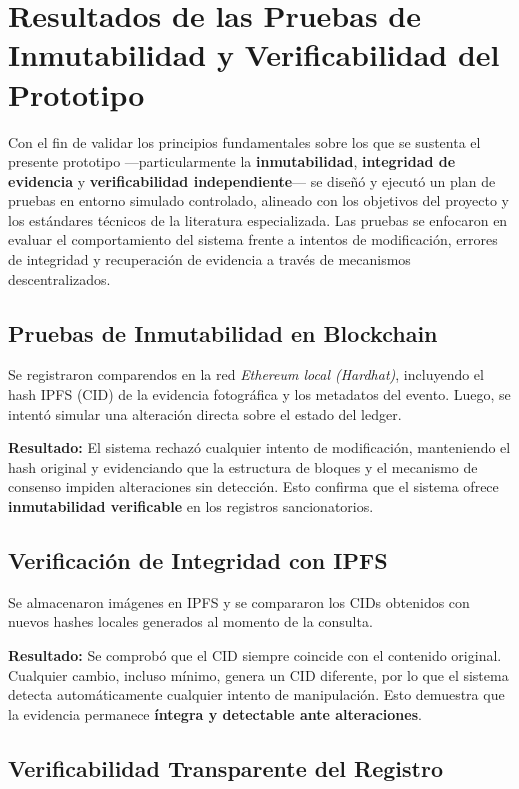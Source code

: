 \section{Resultados de las Pruebas de Inmutabilidad y Verificabilidad del Prototipo}

Con el fin de validar los principios fundamentales sobre los que se sustenta el presente prototipo —particularmente la \textbf{inmutabilidad}, \textbf{integridad de evidencia} y \textbf{verificabilidad independiente}— se diseñó y ejecutó un plan de pruebas en entorno simulado controlado, alineado con los objetivos del proyecto y los estándares técnicos de la literatura especializada. Las pruebas se enfocaron en evaluar el comportamiento del sistema frente a intentos de modificación, errores de integridad y recuperación de evidencia a través de mecanismos descentralizados.

\subsection{Pruebas de Inmutabilidad en Blockchain}

Se registraron comparendos en la red \textit{Ethereum local (Hardhat)}, incluyendo el hash IPFS (CID) de la evidencia fotográfica y los metadatos del evento. Luego, se intentó simular una alteración directa sobre el estado del ledger.

\textbf{Resultado:} El sistema rechazó cualquier intento de modificación, manteniendo el hash original y evidenciando que la estructura de bloques y el mecanismo de consenso impiden alteraciones sin detección. Esto confirma que el sistema ofrece \textbf{inmutabilidad verificable} en los registros sancionatorios.

\subsection{Verificación de Integridad con IPFS}

Se almacenaron imágenes en IPFS y se compararon los CIDs obtenidos con nuevos hashes locales generados al momento de la consulta.

\textbf{Resultado:} Se comprobó que el CID siempre coincide con el contenido original. Cualquier cambio, incluso mínimo, genera un CID diferente, por lo que el sistema detecta automáticamente cualquier intento de manipulación. Esto demuestra que la evidencia permanece \textbf{íntegra y detectable ante alteraciones}.

\subsection{Verificabilidad Transparente del Registro}

